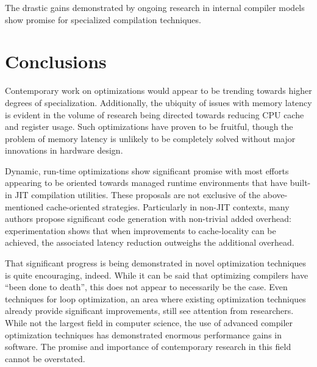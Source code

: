 \documentclass[nobib]{tufte-handout}
\begin{document}
The drastic gains demonstrated by ongoing research in internal compiler models show promise for specialized compilation techniques.

\section{Conclusions}
Contemporary work on optimizations would appear to be trending towards higher degrees of specialization.  Additionally, the ubiquity of issues with memory latency is evident in the volume of research being directed towards reducing CPU cache and register usage.  Such optimizations have proven to be fruitful, though the problem of memory latency is unlikely to be completely solved without major innovations in hardware design.  

Dynamic, run-time optimizations show significant promise with most efforts appearing to be oriented towards managed runtime environments that have built-in JIT compilation utilities.  These proposals are not exclusive of the above-mentioned cache-oriented strategies.  Particularly in non-JIT contexts, many authors propose significant code generation with non-trivial added overhead: experimentation shows that when improvements to cache-locality can be achieved, the associated latency reduction outweighs the additional overhead.  

That significant progress is being demonstrated in novel optimization techniques is quite encouraging, indeed.  While it can be said that optimizing compilers have ``been done to death'', this does not appear to necessarily be the case.  Even techniques for loop optimization, an area where existing optimization techniques already provide significant improvements, still see attention from researchers.  While not the largest field in computer science, the use of advanced compiler optimization techniques has demonstrated enormous performance gains in software.  The promise and importance of contemporary research in this field cannot be overstated.



\newpage
\nocite{*}


\end{document}
